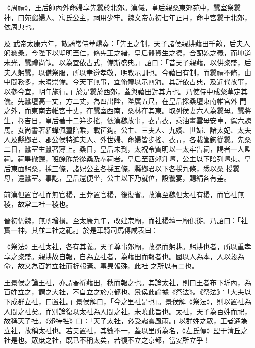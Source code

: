 \begin{pinyinscope}
 《周禮》，王后帥內外命婦享先蠶於北郊。漢儀，皇后親桑東郊苑中，蠶室祭蠶神，曰苑窳婦人、寓氏公主，祠用少牢。魏文帝黃初七年正月，命中宮蠶于北郊，依周典也。



 及
 武帝太康六年，散騎常侍華嶠奏：「先王之制，天子諸侯親耕藉田千畝，后夫人躬蠶桑。今陛下以聖明至仁，脩先王之緒，皇后體資生之德，合配乾之義，而坤道未光，蠶禮尚缺。以為宜依古式，備斯盛典。」詔曰：「昔天子親藉，以供粢盛，后夫人躬蠶，以備祭服，所以聿遵孝敬，明教示訓也。今藉田有制，而蠶禮不脩，由中間務多，未暇崇備。今天下無事，宜脩禮以示四海。其詳依古典，及近代故事，以參今宜，明年施行。」於是蠶於西郊，蓋與藉田對其方也。乃使侍中成粲草定其儀。先蠶壇高一丈，方二丈，為四出陛，陛廣五尺，在皇后採桑壇東南帷宮外
 門之外，而東南去帷宮十丈，在蠶室西南，桑林在其東。取列侯妻六人為蠶母。蠶將生，擇吉日，皇后著十二笄步搖，依漢魏故事，衣青衣，乘油畫雲母安車，駕六騩馬。女尚書著貂蟬佩璽陪乘，載筐鉤。公主、三夫人、九嬪、世婦、諸太妃、太夫人及縣鄉君、郡公侯特進夫人、外世婦、命婦皆步搖、衣青，各載筐鉤從蠶。先桑二日，蠶室生蠶著薄上。桑日，皇后未到，太祝令質明以一太牢告祠，謁者一人監祠。祠畢撤饌，班餘胙於從桑及奉祠者。皇后至西郊升壇，公主以下陪列壇東。皇后東面躬桑，採三條，諸妃公主各採五條，縣鄉君以下各採九條，悉以桑
 授蠶母，還蠶室。事訖，皇后還便坐，公主以下乃就位，設饗宴，賜絹各有差。



 前漢但置官社而無官稷，王莽置官稷，後復省。故漢至魏但太社有稷，而官社無稷，故常二社一稷也。



 晉初仍魏，無所增損。至太康九年，改建宗廟，而社稷壇一廟俱徙。乃詔曰：「社實一神，其並二社之祀。」於是車騎司馬傅咸表曰：



 《祭法》王社太社，各有其義。天子尊事郊廟，故冕而躬耕。躬耕也者，所以重孝享之粢盛。親耕故自報，自為立社者，為藉田而報者也。國以人為本，人以穀為命，故又為百姓立社而祈報焉。事異報殊，此社
 之所以有二也。



 王景侯之論王社，亦謂春祈藉田，秋而報之也。其論太社，則曰王者布下圻內，為百姓立之，謂之大社，不自立之於京都也。景侯此論據《祭法》。《祭法》：「大夫以下成群立社，曰置社。」景侯解曰，「今之里社是也」。景侯解《祭法》，則以置社為人間之社矣。而別論復以太社為人間之社，未曉此旨也。太社，天子為百姓而祀，故稱天子社。《郊特牲》曰：「天子太社，必受霜露風雨。」以群姓之眾，王者通為立社，故稱太社也。若夫置社，其數不一，蓋以里所為名，《左氏傳》盟于清丘之社是也。眾庶之社，既已不稱太矣，若復不立之京都，當安所立乎！




\end{pinyinscope}
